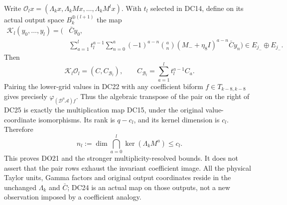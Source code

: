 Write $\mathcal O_lx=(\Lambda_kx,\Lambda_kMx,\ldots,
\Lambda_kM^lx)$.  With $t_l$ selected in DC14, define on its actual
output space $B_k^{\oplus(l+1)}$ the map
\[
 \begin{split}
 \mathcal K_l(y_0,\ldots,y_l)=\biggl(&\bar C y_0,\\[-3pt]
 &\sum_{a=1}^lt_l^{a-1}\sum_{n=0}^a(-1)^{a-n}\binom an
            (M_-+\eta_8I)^{a-n}\bar C y_n\biggr)
      \in E_{j_-}\oplus E_{j_-}.
 \end{split}                                                     \tag{DC24}
\]
Then
\[
 \mathcal K_l\mathcal O_l=(C,C_{\mathcal B_l}),
 \qquad C_{\mathcal B_l}=\sum_{a=1}^lt_l^{a-1}C_a.               \tag{DC25}
\]
Pairing the lower-grid values in DC22 with any coefficient biform
$f\in T_{k-8,k-8}$ gives precisely
$\varphi_{(\mathcal D^a\mathcal A)f}$.  Thus the algebraic transpose
of the pair on the right of DC25 is exactly the multiplication map
DC15, under the original value-coordinate isomorphisms.  Its rank
is $q-c_l$, and its kernel dimension is $c_l$.  Therefore
\[
 n_l:=\dim\bigcap_{a=0}^l\ker(\Lambda_kM^a)\le c_l.            \tag{DC26}
\]
This proves DO21 and the stronger multiplicity-resolved bounds.  It
does not assert that the pair rows exhaust the invariant coefficient
image.  All the physical Taylor units, Gamma factors and original
output coordinates reside in the unchanged $\Lambda_k$ and $\bar C$;
DC24 is an actual map on those outputs, not a new observation imposed
by a coefficient analogy.

